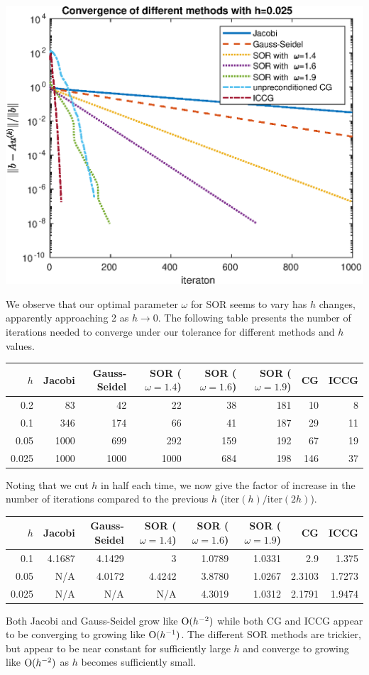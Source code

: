 \documentclass{article}
\begin{document}
\begin{centering}
\includegraphics[scale=0.7]{h=0.025.eps}\\
\end{centering}
We observe that our optimal parameter $\omega$ for SOR seems to vary has $h$ changes, apparently approaching 2 as $h\to0$. The following table presents the number of iterations needed to converge under our tolerance for different methods and $h$ values.
\begin{table}[H]\centering
\begin{tabular}{|r|r|r|r|r|r|r|r|}\hline
{$h$}&{Jacobi}&{Gauss-Seidel}&{SOR ($\omega=1.4$)}&{SOR ($\omega=1.6$)}&{SOR ($\omega=1.9$)}&{CG}&{ICCG}\\\hline
0.2&83&42&22&38&181&10&8\\
0.1&346&174&66&41&187&29&11\\
0.05&1000&699&292&159&192&67&19\\
0.025&1000&1000&1000&684&198&146&37\\\hline
\end{tabular}
\end{table}
Noting that we cut $h$ in half each time, we now give the factor of increase in the number of iterations compared to the previous $h$ ($\text{iter}(h)/\text{iter}(2h)$).
\begin{table}[H]\centering
\begin{tabular}{|r|r|r|r|r|r|r|r|}\hline
{$h$}&{Jacobi}&{Gauss-Seidel}&{SOR ($\omega=1.4$)}&{SOR ($\omega=1.6$)}&{SOR ($\omega=1.9$)}&{CG}&{ICCG}\\\hline
0.1&4.1687&4.1429&3&1.0789&1.0331&2.9&1.375\\
0.05&{N/A}&4.0172&4.4242&3.8780&1.0267&2.3103&1.7273\\
0.025&{N/A}&{N/A}&{N/A}&4.3019&1.0312&2.1791&1.9474\\\hline
\end{tabular}
\end{table}
Both Jacobi and Gauss-Seidel grow like $\operatorname{O}(h^{-2})$ while both CG and ICCG appear to be converging to growing like $\operatorname{O}(h^{-1})$. The different SOR methods are trickier, but appear to be near constant for sufficiently large $h$ and converge to growing like $\operatorname{O}(h^{-2})$ as $h$ becomes sufficiently small.
\end{document}
